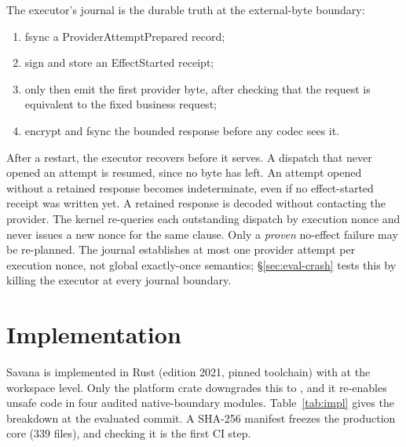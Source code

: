 \documentclass[letterpaper,twocolumn,10pt]{article}
\newcommand{\sys}{Savana}
\newcommand{\code}[1]{\texttt{\detokenize{#1}}}
\begin{document}
The executor's journal is the durable truth at the external-byte boundary:
\begin{enumerate}
\item fsync a \textsf{ProviderAttemptPrepared} record;
\item sign and store an \textsf{EffectStarted} receipt;
\item only then emit the first provider byte, after checking that the
  request is equivalent to the fixed business request;
\item encrypt and fsync the bounded response before any codec sees it.
\end{enumerate}
After a restart, the executor recovers before it serves. A dispatch that
never opened an attempt is resumed, since no byte has left. An attempt
opened without a retained response becomes indeterminate, even if no
effect-started receipt was written yet. A retained response is decoded
without contacting the provider. The kernel re-queries each outstanding
dispatch by execution nonce and never issues a new nonce for the same
clause. Only a \emph{proven} no-effect failure may be re-planned. The
journal establishes at most one provider attempt per execution nonce, not
global exactly-once semantics; \S\ref{sec:eval-crash} tests this by killing
the executor at every journal boundary.

\section{Implementation}
\label{sec:impl}

\sys{} is implemented in Rust (edition 2021, pinned toolchain) with
\code{unsafe_code = "forbid"} at the workspace level. Only the platform
crate downgrades this to \code{deny}, and it re-enables unsafe code in four
audited native-boundary modules. Table~\ref{tab:impl} gives the breakdown
at the evaluated commit. A SHA-256 manifest freezes the production core
(339 files), and checking it is the first CI step.
\end{document}
